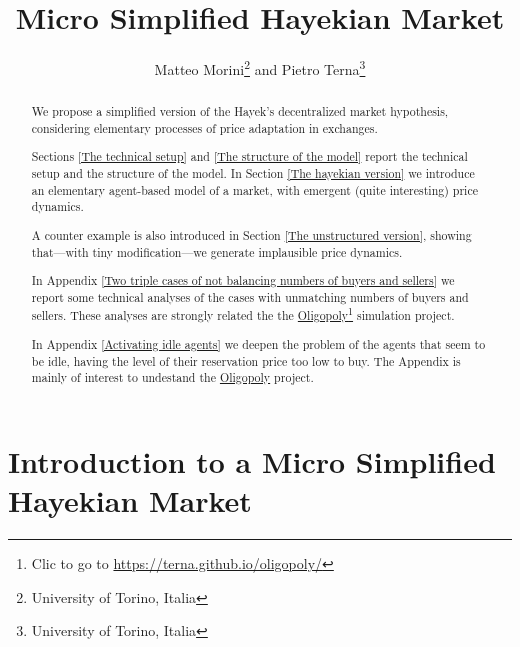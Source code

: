 \documentclass[10pt]{report}
\title{Micro Simplified Hayekian Market}
\author{Matteo Morini\footnote{University of Torino, Italia} and Pietro Terna\footnote{University of Torino, Italia}}
\begin{document}
\maketitle
\thispagestyle{fancy}



\begin{abstract}
\thispagestyle{fancy}

We propose a simplified version of the Hayek's decentralized market hypothesis, considering elementary processes of price adaptation in exchanges.

Sections \ref{The technical setup} and \ref{The structure of the model} report the technical setup and the structure of the model. In Section \ref{The hayekian version} we introduce an elementary agent-based model of a market, with emergent (quite interesting)  price dynamics.

A counter example is also introduced in Section \ref{The unstructured version}, showing that---with tiny modification---we generate implausible price dynamics.

In Appendix \ref{Two triple cases of not balancing numbers of buyers and sellers} we report some technical analyses of the cases with unmatching numbers of buyers and sellers. These analyses are strongly related the the \href{https://terna.github.io/oligopoly/}{Oligopoly}\footnote{Clic to go to \url{https://terna.github.io/oligopoly/}} simulation project.

In Appendix \ref{Activating idle agents} we deepen the problem of the agents that seem to be idle, having the level of their reservation price too low to buy. The Appendix is mainly of interest to undestand the \href{https://terna.github.io/oligopoly/}{Oligopoly} project.
\end{abstract}


\setcounter{page}{2}
\tableofcontents
\thispagestyle{fancy}


\listoffigures
\thispagestyle{fancy}
\setcounter{page}{2}




\chapter*{Introduction to a Micro Simplified Hayekian Market}
\label{micro Hayekian Market}
\thispagestyle{fancy}
%
\end{document}
